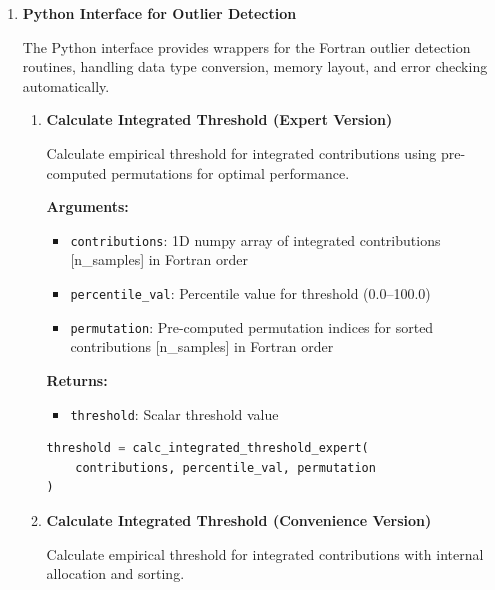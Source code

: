 \begin{enumerate}
    \item \textbf{Python Interface for Outlier Detection}
          
          The Python interface provides wrappers for the Fortran outlier detection routines,
          handling data type conversion, memory layout, and error checking
          automatically.
          
          \begin{enumerate}
            \item \textbf{Calculate Integrated Threshold (Expert Version)}
                  
                  Calculate empirical threshold for integrated contributions using pre-computed
                  permutations for optimal performance.
                  
                  \textbf{Arguments:}
                  \begin{itemize}
                    \item \texttt{contributions}: 1D numpy array of integrated contributions
                          [n\_samples] in Fortran order
                          
                    \item \texttt{percentile\_val}: Percentile value for threshold (0.0--100.0)
                          
                    \item \texttt{permutation}: Pre-computed permutation indices for sorted
                          contributions [n\_samples] in Fortran order
                  \end{itemize}
                  \textbf{Returns:}
                  \begin{itemize}
                    \item \texttt{threshold}: Scalar threshold value
                  \end{itemize}
                  \begin{lstlisting}[language=Python, caption={Integrated Threshold Calculation (Expert)}]
threshold = calc_integrated_threshold_expert(
    contributions, percentile_val, permutation
)
                  \end{lstlisting}
                  
            \item \textbf{Calculate Integrated Threshold (Convenience Version)}
                  
                  Calculate empirical threshold for integrated contributions with internal
                  allocation and sorting.
                  

\end{enumerate}
\end{enumerate}
